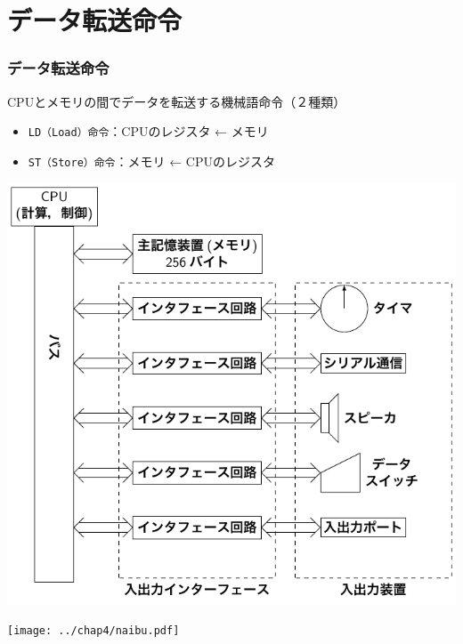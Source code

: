 \documentclass[handout]{beamer}        %
\begin{document}
\section{データ転送命令}
\begin{frame}
  \frametitle{データ転送命令}
  CPUとメモリの間でデータを転送する機械語命令（２種類）
  \begin{itemize}
  \item \texttt{LD（Load）命令}：CPUのレジスタ ← メモリ
  \item \texttt{ST（Store）命令}：メモリ ← CPUのレジスタ
  \end{itemize}
  \vfill
  \begin{minipage}{0.49\columnwidth}
  \centerline{\includegraphics[scale=0.63,clip,trim=0 3cm 3cm 0]
    {../Tikz/kousei2.pdf}}
  \end{minipage}
  \begin{minipage}{0.49\columnwidth}
  \centerline{\texttt{[image: ../chap4/naibu.pdf]}}
  \end{minipage}
\end{frame}
\end{document}
